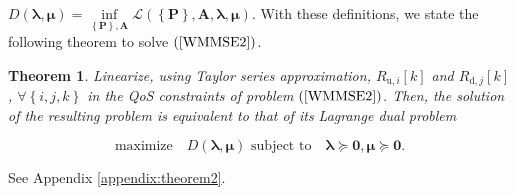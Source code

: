 \documentclass[9pt,journal]{IEEEtran}
\newcommand{\paren}[1]{\left({#1}\right)}
\newcommand{\bracket}[1]{{\left [{#1}\right ]}}
\newcommand{\braces}[1]{{\left\{ {#1}\right\}}}
\newtheorem{theorem}{Theorem}
\theoremstyle{definition}
\begin{document}
$D\paren{\boldsymbol{\lambda},\boldsymbol{\mu}}=\underset{\braces{\mathbf{P}},\mathbf{A}}\inf \mathcal{L}\paren{\braces{\mathbf{P}},\mathbf{A},\boldsymbol{\lambda},\boldsymbol{\mu}}$. %
With these definitions, we state the following theorem to solve $\paren{\ref{WMMSE2}}$.
\begin{theorem}\label{theorem: dual}
Linearize, using Taylor series approximation, $R_{\textrm{u},i}\bracket{k}$ and $R_{\textrm{d},j}\bracket{k}$, $\forall\braces{i,j,k}$ in the QoS constraints of problem $\paren{\ref{WMMSE2}}$. Then, the solution of the resulting problem is equivalent to that of its Lagrange dual problem %
\par\noindent\small
\begin{equation}
\label{dualproblem}
\text{maximize} \quad D\paren{\boldsymbol{\lambda},\boldsymbol{\mu}}\text{  subject to}\quad  \boldsymbol{\lambda}  \succeq \mathbf{0}, \boldsymbol{\mu} \succeq \mathbf{0}.    
\end{equation}

\end{theorem}
\begin{IEEEproof}
See Appendix \ref{appendix:theorem2}.
\end{IEEEproof}
\end{document}
